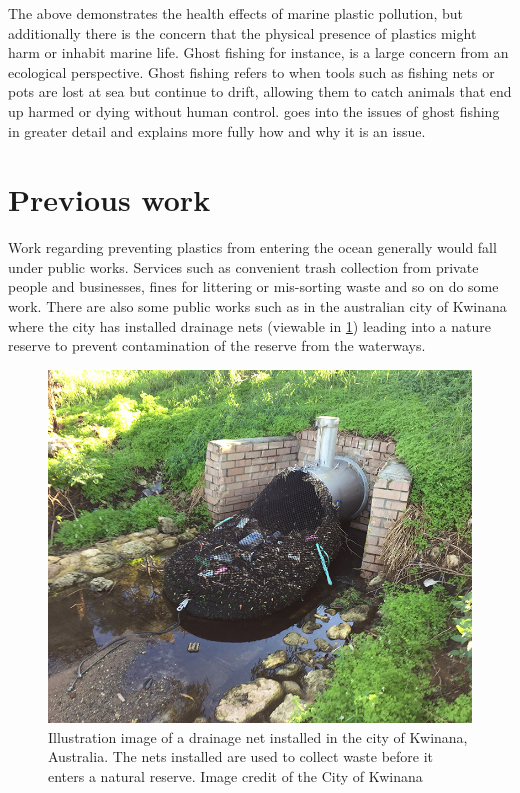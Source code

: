\documentclass[class=article, crop=false]{standalone}
\begin{document}
The above demonstrates the health effects of marine plastic pollution, but additionally there is the concern that the physical presence of plastics might harm or inhabit marine life. Ghost fishing for instance, is a large concern from an ecological perspective. Ghost fishing refers to when tools such as fishing nets or pots are lost at sea but continue to drift, allowing them to catch animals that end up harmed or dying without human control. \citet{matsuoka_review_2005} goes into the issues of ghost fishing in greater detail and explains more fully how and why it is an issue.

\section{Previous work}
Work regarding preventing plastics from entering the ocean generally would fall under public works. Services such as convenient trash collection from private people and businesses, fines for littering or mis-sorting waste and so on do some work. There are also some public works such as in the australian city of Kwinana where the city has installed drainage nets (viewable in \cref{fig:waste_net}) leading into a nature reserve to prevent contamination of the reserve from the waterways.

\begin{figure}
	\centering
	\includegraphics{waste_net}
	\caption{Illustration image of a drainage net installed in the city of Kwinana, Australia. The nets installed are used to collect waste before it enters a natural reserve. Image credit of the City of Kwinana}
	\label{fig:waste_net}
\end{figure}
\end{document}

